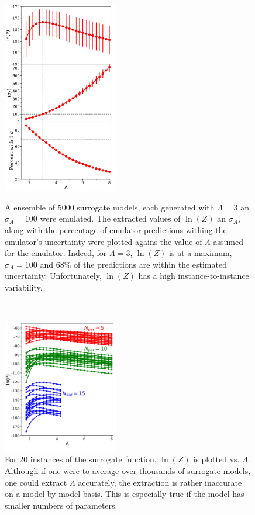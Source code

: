 \documentclass[UserManual.tex]{subfiles}
\begin{document}
\begin{figure}
\parbox[t]{0.45\textwidth}{
\centerline{\includegraphics[width=0.45\textwidth]{vslambda}}
\caption{\label{fig:vslambda}
A ensemble of 5000 surrogate models, each generated with $\Lambda=3$ an $\sigma_A=100$ were emulated. The extracted values of $\ln(Z)$ an $\sigma_A$, along with the percentage of emulator predictions withing the emulator's uncertainty were plotted agains the value of $\Lambda$ assumed for the emulator. Indeed, for $\Lambda=3$, $\ln(Z)$ is at a maximum, $\sigma_A=100$ and 68\% of the predictions are within the estimated uncertainty. Unfortunately, $\ln(Z)$ has a high instance-to-instance variability.}}
~~~~\parbox[t]{0.45\textwidth}{ \vspace*{-266pt}
\centerline{\includegraphics[width=0.45\textwidth]{logPinstances}}
\caption{\label{fig:logPinstances}
For 20 instances of the surrogate function, $\ln(Z)$ is plotted vs. $\Lambda$. Although if one were to average over thousands of surrogate models, one could extract $\Lambda$ accurately, the extraction is rather inaccurate on a model-by-model basis. This is especially true if the model has smaller numbers of parameters.}}
\end{figure}
\end{document}
